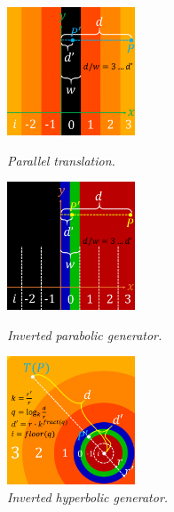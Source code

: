 \begin{figure}[h!tbp]
 \begin{minipage}[t]{0.24\hsize}
  \begin{center}
   \includegraphics[width=1.5in, height=1.5in, keepaspectratio]{./img/application/optimization/translationMod.pdf}
  \end{center}
  \caption{\textit{Parallel translation.}}
  \label{fig:translationMod}
 \end{minipage}
 \hspace*{\fill}
 \begin{minipage}[t]{0.24\hsize}
  \begin{center}
   \includegraphics[width=1.5in, height=1.5in, keepaspectratio]{./img/application/optimization/parabolicMod.pdf}
  \end{center}
  \caption{\textit{Inverted parabolic generator.}}
  \label{fig:parabolicMod}
 \end{minipage}
 \hspace*{\fill}
 \begin{minipage}[t]{0.24\hsize}
   \begin{center}
    \includegraphics[width=1.5in, height=1.5in, keepaspectratio]{./img/application/optimization/hyperbolicMod.pdf}
   \end{center}
   \caption{\textit{Inverted hyperbolic generator.}}

\end{minipage}
\end{figure}
